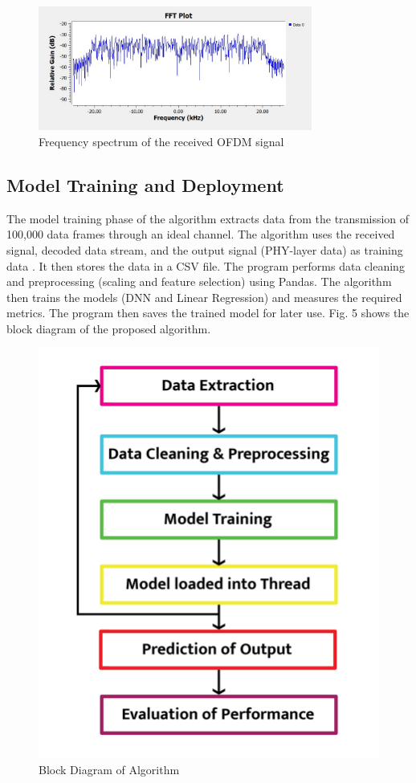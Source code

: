 \documentclass[conference]{IEEEtran}
\begin{document}
\begin{figure}[htbp]
\centerline{\includegraphics[width=9cm]{spectrum.jpg}}
\caption{Frequency spectrum of the received OFDM signal}
\label{spectrum}
\end{figure}

\subsection{Model Training and Deployment}
The model training phase of the algorithm extracts data from the transmission of 100,000 data frames through an ideal channel. The algorithm uses the received signal, decoded data stream, and the output signal (PHY-layer data) as training data \cite{b2}. It then stores the data in a CSV file. The program performs data cleaning and preprocessing (scaling and feature selection) using Pandas. The algorithm then trains the models (DNN and Linear Regression) and measures the required metrics. The program then saves the trained model for later use. Fig. 5 shows the block diagram of the proposed algorithm.

\begin{figure}[htbp]
\centerline{\includegraphics[scale=0.35]{algoflow.png}}
\caption{Block Diagram of Algorithm}
\label{algo}
\end{figure}
\end{document}
